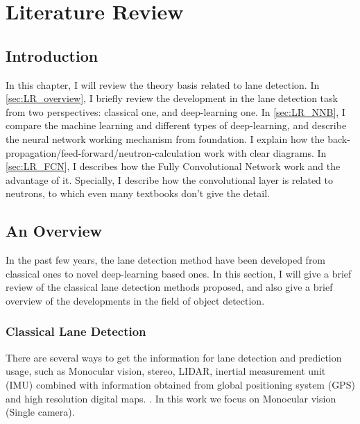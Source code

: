 
\chapter{Literature Review}
\label{cha:literature}
\begin{spacing}{1.5}
\setlength{\parskip}{0.3in}

\section{Introduction}

In this chapter, I will review the theory basis related to lane detection. In \autoref{sec:LR_overview}, I briefly review the development in the lane detection task from two perspectives: classical one, and deep-learning one. In \autoref{sec:LR_NNB}, I compare the machine learning and different types of deep-learning, and describe the neural network working mechanism from foundation. I explain how the back-propagation/feed-forward/neutron-calculation work with clear diagrams. In \autoref{sec:LR_FCN}, I describes how the Fully Convolutional Network work and the advantage of it. Specially, I describe how the convolutional layer is related to neutrons, to which even many textbooks don't give the detail.

\section{An Overview}
\label{sec:LR_overview}

In the past few years, the lane detection method have been developed from classical ones to novel deep-learning based ones. In this section, I will give a brief review of the classical lane detection methods proposed, and also give a brief overview of the developments in the field of object detection.

\subsection{Classical Lane Detection}

There are several ways to get the information for lane detection and prediction usage, such as Monocular vision, stereo, LIDAR, inertial measurement unit (IMU) combined with information obtained from global positioning system (GPS) and high resolution digital maps. \cite{hillel2014recent}. In this work we focus on Monocular vision (Single camera).


\end{spacing}
